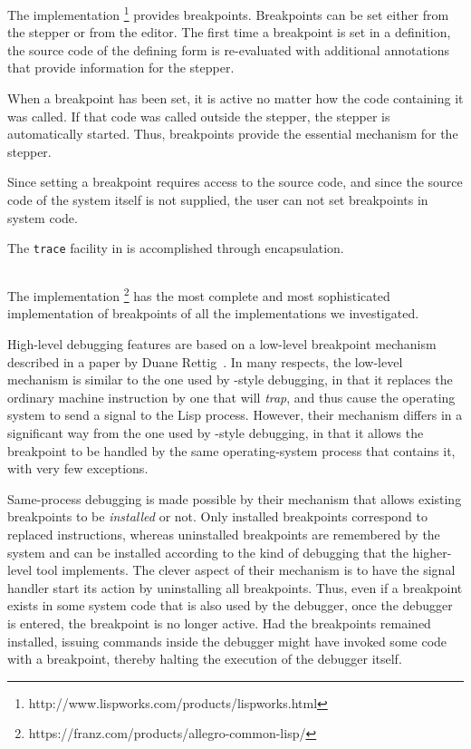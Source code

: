The \lispworks{} \commonlisp{} implementation%
\footnote{http://www.lispworks.com/products/lispworks.html}
provides breakpoints.  Breakpoints can be set either from the stepper
or from the editor.  The first time a breakpoint is set in a
definition, the source code of the defining form is re-evaluated with
additional annotations that provide information for the stepper.

When a breakpoint has been set, it is active no matter how the code
containing it was called.  If that code was called outside the
stepper, the stepper is automatically started.  Thus, breakpoints
provide the essential mechanism for the stepper.

Since setting a breakpoint requires access to the source code, and
since the source code of the system itself is not supplied, the user
can not set breakpoints in system code.

The \texttt{trace} facility in \lispworks{} is accomplished through
encapsulation.

\subsection{\allegro{}}

The \allegro{} \commonlisp{} implementation%
\footnote{https://franz.com/products/allegro-common-lisp/}
has the most complete and most sophisticated implementation of
breakpoints of all the \commonlisp{} implementations we investigated.

High-level debugging features are based on a low-level breakpoint
mechanism described in a paper by Duane
Rettig~\cite{Rettig:Instruction-level-breakpoints}.  In many respects,
the low-level mechanism is similar to the one used by \unix{}-style
debugging, in that it replaces the ordinary machine instruction by one
that will \emph{trap}, and thus cause the operating system to send a
signal to the Lisp process.  However, their mechanism differs in a
significant way from the one used by \unix{}-style debugging, in that
it allows the breakpoint to be handled by the same operating-system
process that contains it, with very few exceptions.

Same-process debugging is made possible by their mechanism that allows
existing breakpoints to be \emph{installed} or not.  Only installed
breakpoints correspond to replaced instructions, whereas uninstalled
breakpoints are remembered by the system and can be installed
according to the kind of debugging that the higher-level tool
implements.  The clever aspect of their mechanism is to have the
signal handler start its action by uninstalling all breakpoints.
Thus, even if a breakpoint exists in some system code that is also
used by the debugger, once the debugger is entered, the breakpoint is
no longer active.  Had the breakpoints remained installed, issuing
commands inside the debugger might have invoked some code with a
breakpoint, thereby halting the execution of the debugger itself.


